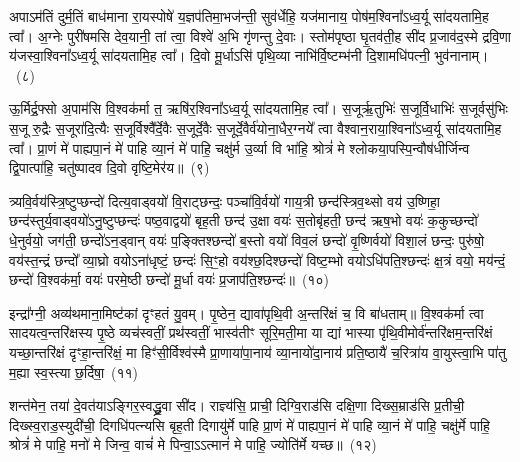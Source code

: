 अपाऽम॑तिं दुर्म॒तिं बाध॑माना रा॒यस्पोषे॑ य॒ज्ञप॑तिमा॒भज॑न्ती॒ सुव॑र्धेहि॒ यज॑मानाय॒ पोष॑म॒श्विना᳚\-ऽ\-ध्व॒र्यू सा॑दयतामि॒ह त्वा᳚। अ॒ग्नेः पुरी॑षमसि देव॒यानी॒ तां त्वा॒ विश्वे॑ अ॒भि गृ॑णन्तु दे॒वाः। स्तोम॑पृष्ठा घृ॒तव॑ती॒ह सी॑द प्र॒जाव॑द॒स्मे द्रवि॒णा य॑जस्वा॒श्विना᳚\-ऽ\-ध्व॒र्यू सा॑दयतामि॒ह त्वा᳚। दि॒वो मू॒र्धाऽसि॑ पृथि॒व्या नाभि॑र्वि॒ष्टम्भ॑नी दि॒शामधि॑पत्नी॒ भुव॑नानाम्।~(८)\ip

ऊ॒र्मिर्द्र॒फ्सो अ॒पाम॑सि वि॒श्वक॑र्मा त॒ ऋषि॑र॒श्विना᳚\-ऽ\-ध्व॒र्यू सा॑दयता\-मि॒ह त्वा᳚। स॒जूर्\mbox{}ऋ॒तुभिः॑ स॒जूर्वि॒धाभिः॑ स॒जूर्वसु॑भिः स॒जू रु॒द्रैः स॒जूरा॑दि॒त्यैः स॒जूर्विश्वै᳚र्दे॒वैः स॒जूर्दे॒वैः स॒जूर्दे॒वैर्व॑योना॒धैर॒ग्नये᳚ त्वा वैश्वान॒राया॒श्विना᳚\-ऽ\-ध्व॒र्यू सा॑दयतामि॒ह त्वा᳚। प्रा॒णं मे॑ पाह्यपा॒नं मे॑ पाहि व्या॒नं मे॑ पाहि॒ चक्षु॑र्म उ॒र्व्या वि भा॑हि॒ श्रोत्रं॑ मे श्लोकया॒पस्पि॒न्वौष॑धीर्जिन्व द्वि॒पात्पा॑हि॒ चतु॑ष्पादव दि॒वो वृष्टि॒मेर॑य॥~(९)\ip

{\anuvakamend[{सु॒वीरं॒ भुव॑नानामु॒र्व्या स॒प्तद॑श च}]}

त्र्यवि॒र्वय॑स्त्रि॒ष्टुप्छन्दो॑ दित्य॒वाड्वयो॑ वि॒राट्छन्दः॒ पञ्चा॑वि॒र्वयो॑ गाय॒त्री छन्द॑स्त्रिव॒थ्सो वय॑ उ॒ष्णिहा॒ छन्द॑स्तुर्य॒वाड्वयो॑\-ऽ\-नु॒ष्टुप्छन्दः॑ पष्ठ॒वाद्वयो॑ बृह॒ती छन्द॑ उ॒क्षा वयः॑ स॒तोबृ॑हती॒ छन्द॑ ऋष॒भो वयः॑ क॒कुच्छन्दो॑ धे॒नुर्वयो॒ जग॑ती॒ छन्दो॑\-ऽ\-न॒ड्वान् वयः॑ प॒ङ्क्तिश्छन्दो॑ ब॒स्तो वयो॑ विव॒लं छन्दो॑ वृ॒ष्णिर्वयो॑ विशा॒लं छन्दः॒ पुरु॑षो॒ वय॑स्त॒न्द्रं छन्दो᳚ व्या॒घ्रो वयो\-ऽ\-ना॑धृष्टं॒ छन्दः॑ सि॒ꣳ॒हो वय॑श्छ॒दिश्छन्दो॑ विष्ट॒म्भो वयो\-ऽधि॑\-पति॒श्छन्दः॑ क्ष॒त्रं वयो॒ मय॑न्दं॒ छन्दो॑ वि॒श्वक॑र्मा॒ वयः॑ परमे॒ष्ठी छन्दो॑ मू॒र्धा वयः॑ प्र॒जा\-प॑ति॒श्छन्दः॑॥~(१०)\ip

{\anuvakamend[{पुरु॑षो॒ वयः॒ षड्विꣳ॑शतिश्च}]}

इन्द्रा᳚ग्नी॒ अव्य॑थमाना॒मिष्ट॑कां दृꣳहतं यु॒वम्। पृ॒ष्ठेन॒ द्यावा॑\-पृथि॒वी अ॒न्तरि॑क्षं च॒ वि बा॑धताम्॥ वि॒श्वक॑र्मा त्वा सादयत्व॒न्त\-रि॑क्षस्य पृ॒ष्ठे व्यच॑स्वतीं॒ प्रथ॑स्वतीं॒ भास्व॑तीꣳ सूरि॒मती॒मा या द्यां भास्या पृ॑थि॒वीमोर्व॑न्तरि॑क्षम॒न्तरि॑क्षं यच्छा॒न्तरि॑क्षं दृꣳहा॒न्तरि॑क्षं॒ मा हिꣳ॑सी॒र्विश्व॑स्मै प्रा॒णाया॑पा॒नाय॑ व्या॒नायो॑दा॒नाय॑ प्रति॒ष्ठायै॑ च॒रित्रा॑य वा॒युस्त्वा॒भि पा॑तु म॒ह्या स्व॒स्त्या छ॒र्दिषा॒~(११)\ip

शन्त॑मेन॒ तया॑ दे॒वत॑या\-ऽ\-ङ्गिर॒स्वद्ध्रु॒वा सी॑द। राज्ञ्य॑सि॒ प्राची॒ दिग्वि॒राड॑सि दक्षि॒णा दिख्स॒म्राड॑सि प्र॒तीची॒ दिख्स्व॒राड॒स्युदी॑ची॒ दिगधि॑पत्न्यसि बृह॒ती दिगायु॑र्मे पाहि प्रा॒णं मे॑ पाह्यपा॒नं मे॑ पाहि व्या॒नं मे॑ पाहि॒ चक्षु॑र्मे पाहि॒ श्रोत्रं॑ मे पाहि॒ मनो॑ मे जिन्व॒ वाचं॑ मे पिन्वा॒ऽऽत्मानं॑ मे पाहि॒ ज्योति॑र्मे यच्छ॥~(१२)\ip

